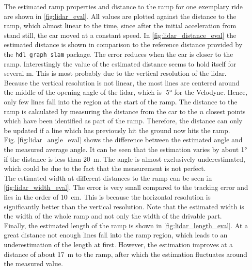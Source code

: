 The estimated ramp properties and distance to the ramp for one exemplary ride are shown in \cref{fig:lidar_eval}.
All values are plotted against the distance to the ramp, which almost linear to the time, since after the initial acceleration from stand still, the car moved at a constant speed.
In \cref{fig:lidar_distance_eval} the estimated distance is shown in comparison to the reference distance provided by the \texttt{hdl\_graph\_slam} package.
The error reduces when the car is closer to the ramp.
Interestingly the value of the estimated distance seems to hold itself for several \si{\metre}.
This is most probably due to the vertical resolution of the \gls{lidar}.
Because the vertical resolution is not linear, the most lines are centered around the middle of the opening angle of the \gls{lidar}, which is -\ang{5} for the Velodyne.
Hence, only few lines fall into the region at the start of the ramp.
The distance to the ramp is calculated by measuring the distance from the car to the $n$ closest points which have been identified as part of the ramp.
Therefore, the distance can only be updated if a line which has previously hit the ground now hits the ramp.\\
Fig. \ref{fig:lidar_angle_eval} shows the difference between the estimated angle and the measured average angle.
It can be seen that the estimation varies by about \ang{1} if the distance is less than \SI{20}{\metre}.
The angle is almost exclusively underestimated, which could be due to the fact that the measurement is not perfect.\\
The estimated width at different distances to the ramp can be seen in \cref{fig:lidar_width_eval}.
The error is very small compared to the tracking error and lies in the order of \SI{10}{\cm}.
This is because the horizontal resolution is significantly better than the vertical resolution.
Note that the estimated width is the width of the whole ramp and not only the width of the drivable part.\\
Finally, the estimated length of the ramp is shown in \cref{fig:lidar_length_eval}.
At a great distance not enough lines fall into the ramp region, which leads to an underestimation of the length at first.
However, the estimation improves at a distance of about \SI{17}{\metre} to the ramp, after which the estimation fluctuates around the measured value.
